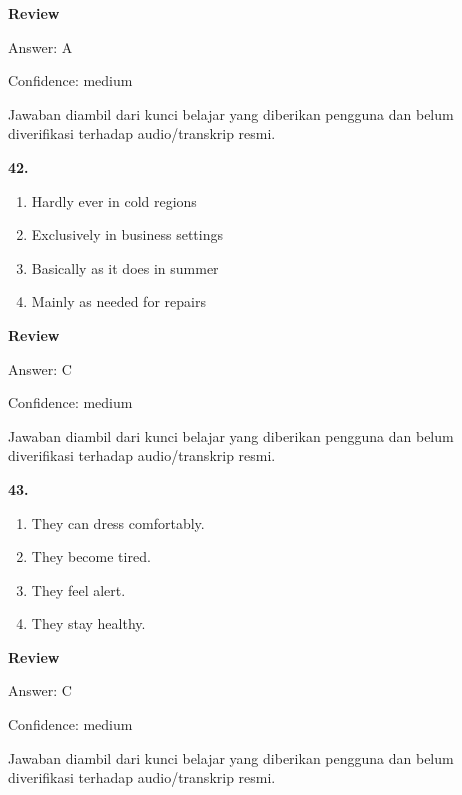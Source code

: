 \documentclass[12pt]{article}
\begin{document}
\begingroup
\setlength{\parskip}{0pt}
\setlength{\parindent}{0pt}
\textbf{Review}\par
Answer: A\par
Confidence: medium\par
Jawaban diambil dari kunci belajar yang diberikan pengguna dan belum diverifikasi terhadap audio/transkrip resmi.\par
\endgroup
\par
\vspace{0.25\baselineskip}
\noindent\textbf{42.}
\begin{enumerate}[label=(\Alph*),leftmargin=*,itemsep=0.2em]
\item Hardly ever in cold regions
\item Exclusively in business settings
\item Basically as it does in summer
\item Mainly as needed for repairs
\end{enumerate}
\par
\begingroup
\setlength{\parskip}{0pt}
\setlength{\parindent}{0pt}
\textbf{Review}\par
Answer: C\par
Confidence: medium\par
Jawaban diambil dari kunci belajar yang diberikan pengguna dan belum diverifikasi terhadap audio/transkrip resmi.\par
\endgroup
\par
\vspace{0.25\baselineskip}
\noindent\textbf{43.}
\begin{enumerate}[label=(\Alph*),leftmargin=*,itemsep=0.2em]
\item They can dress comfortably.
\item They become tired.
\item They feel alert.
\item They stay healthy.
\end{enumerate}
\par
\begingroup
\setlength{\parskip}{0pt}
\setlength{\parindent}{0pt}
\textbf{Review}\par
Answer: C\par
Confidence: medium\par
Jawaban diambil dari kunci belajar yang diberikan pengguna dan belum diverifikasi terhadap audio/transkrip resmi.\par
\endgroup
\par
\vspace{0.25\baselineskip}
\end{document}
